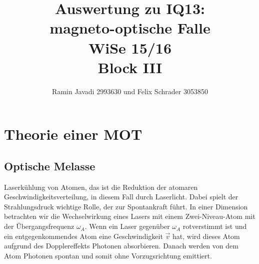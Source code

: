 \documentclass[12pt,a4paper]{article}
\title{Auswertung zu IQ13:\\
       magneto-optische Falle\\
       WiSe 15/16\\
       Block III}
\author{Ramin Javadi 2993630 und Felix Schrader 3053850}
\date{}
\begin{document}
\maketitle
\tableofcontents
\pagebreak
\section{Theorie einer MOT}
  \subsection{Optische Melasse}
  
  Laserkühlung von Atomen, das ist die Reduktion der atomaren Geschwindigkeitsverteilung, in diesem Fall durch Laserlicht. Dabei spielt der Strahlungsdruck wichtige Rolle, der zur Spontankraft führt. In einer Dimension betrachten wir die Wechselwirkung eines Lasers mit einem Zwei-Niveau-Atom mit der Übergangsfrequenz ${\omega_A}$. Wenn ein Laser gegenüber ${\omega_A}$ rotverstimmt ist und ein entgegenkommendes Atom eine Geschwindigkeit ${\vec v}$ hat, wird dieses Atom aufgrund des Dopplereffekts Photonen absorbieren. Danach werden von dem Atom Photonen spontan und somit ohne Vorzugsrichtung emittiert.
  
\end{document}
